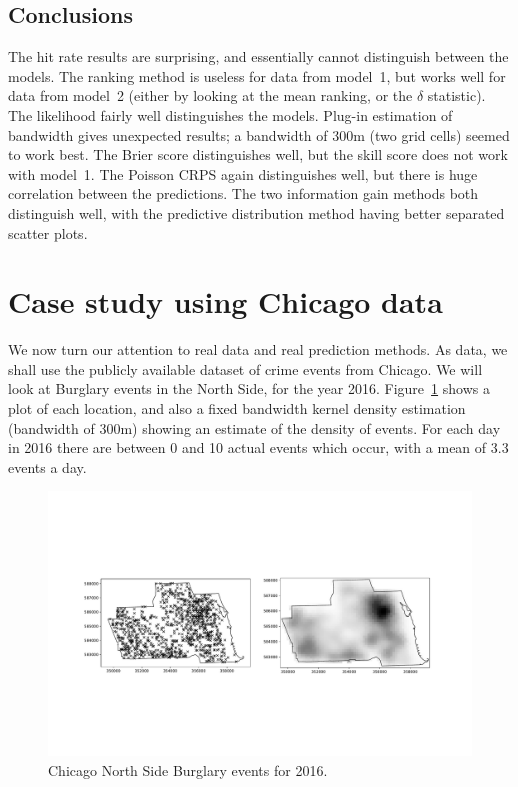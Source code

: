 \documentclass[twoside,a4paper,twocolumn,10pt]{article}
\theoremstyle{plain}
\theoremstyle{definition}
\begin{document}
\subsection{Conclusions}

The hit rate results are surprising, and essentially cannot distinguish between the models.
The ranking method is useless for data from model~1, but works well for data from
model~2 (either by looking at the mean ranking, or the $\delta$ statistic).
The likelihood fairly well distinguishes the models.  Plug-in estimation of bandwidth
gives unexpected results; a bandwidth of 300m (two grid cells) seemed to work best.
The Brier score distinguishes well, but the skill score does not work with model~1.
The Poisson CRPS again distinguishes well, but there is huge correlation between the
predictions.  The two information gain methods both distinguish well, with the predictive
distribution method having better separated scatter plots.




\section{Case study using Chicago data}\label{sec:ChicagoData}

We now turn our attention to real data and real prediction methods.
As data, we shall use the publicly available dataset of crime events from Chicago.
We will look at Burglary events in the North Side, for the year 2016.  Figure~\ref{fig:c1}
shows a plot of each location, and also a fixed bandwidth kernel density estimation (bandwidth
of 300m) showing an estimate of the density of events.  For each day in 2016 there are between
0 and 10 actual events which occur, with a mean of 3.3 events a day.

\begin{figure}
  \includegraphics[width=\textwidth]{../details/northside_events.pdf}
  \caption{Chicago North Side Burglary events for 2016.}
   \label{fig:c1}
\end{figure}
\end{document}
